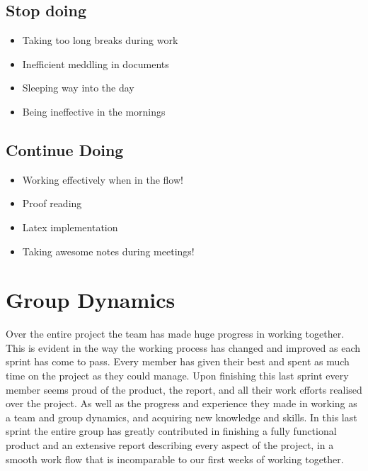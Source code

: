 \subsection{Stop doing}
\begin{itemize}
\item Taking too long breaks during work
\item Inefficient meddling in documents
\item Sleeping way into the day
\item Being ineffective in the mornings
\end{itemize}

\subsection{Continue Doing}
\begin{itemize}
\item Working effectively when in the flow! 
\item Proof reading
\item Latex implementation
\item Taking awesome notes during meetings! 
\end{itemize}

\section{Group Dynamics}
\label{sec:FinalDynamics}
Over the entire project the team has made huge progress in working together. This is evident in the way the working process has changed and improved as each sprint has come to pass. Every member has given their best and spent as much time on the project as they could manage. Upon finishing this last sprint every member seems proud of the product, the report, and all their work efforts realised over the project. As well as the progress and experience they made in working as a team and group dynamics, and acquiring new knowledge and skills. In this last sprint the entire group has greatly contributed in finishing a fully functional product and an extensive report describing every aspect of the project, in a smooth work flow that is incomparable to our first weeks of working together. 